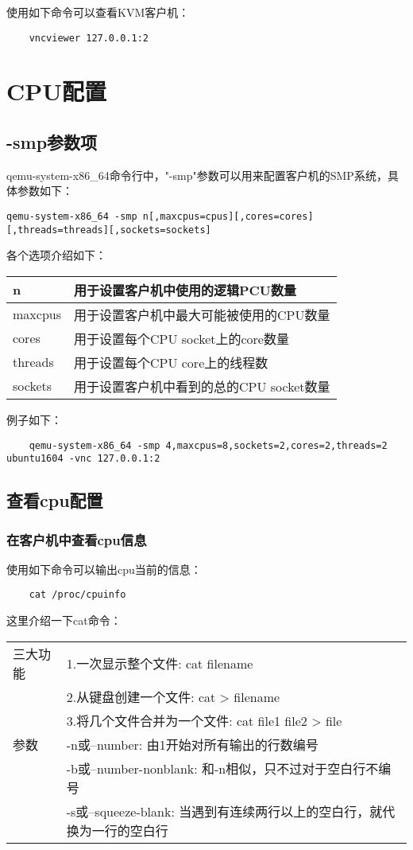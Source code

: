 \documentclass[a4paper,left=2.5cm,right=2.5cm,11pt]{article}
\newcommand{\interval}{\vspace{0.5em}}
\begin{document}
	使用如下命令可以查看KVM客户机：
	\begin{lstlisting}
	vncviewer 127.0.0.1:2
	\end{lstlisting}

\clearpage

\section{CPU配置}
\subsection{-smp参数项}
	qemu-system-x86\_64命令行中，"-smp"参数可以用来配置客户机的SMP系统，具体参数如下：
	\begin{lstlisting}[numberstyle = \color{white}]
	qemu-system-x86_64 -smp n[,maxcpus=cpus][,cores=cores][,threads=threads][,sockets=sockets]
	\end{lstlisting}

	各个选项介绍如下：
	\interval
	\begin{longtable}{p{1.5cm}p{10cm}}
	\hline
	n & 用于设置客户机中使用的逻辑PCU数量 \\
	\hline
	maxcpus & 用于设置客户机中最大可能被使用的CPU数量 \\
	\hline
	cores & 用于设置每个CPU socket上的core数量 \\
	\hline
	threads & 用于设置每个CPU core上的线程数 \\
	\hline
	sockets & 用于设置客户机中看到的总的CPU socket数量 \\
	\hline
	\end{longtable}
	\interval

	例子如下：
	\begin{lstlisting}
	qemu-system-x86_64 -smp 4,maxcpus=8,sockets=2,cores=2,threads=2 ubuntu1604 -vnc 127.0.0.1:2
	\end{lstlisting}

\subsection{查看cpu配置}
\subsubsection{在客户机中查看cpu信息}
	使用如下命令可以输出cpu当前的信息：
	\begin{lstlisting}
	cat /proc/cpuinfo
	\end{lstlisting}

	这里介绍一下cat命令：
	\interval
	\begin{longtable}{lp{12cm}}
	\hline
	三大功能 & 1.一次显示整个文件: cat filename \\
		   & 2.从键盘创建一个文件: cat > filename \\
		   & 3.将几个文件合并为一个文件: cat file1 file2 > file \\
	\hline
	参数  & -n或--number: 由1开始对所有输出的行数编号 \\
		 & -b或--number-nonblank: 和-n相似，只不过对于空白行不编号 \\
		 & -s或--squeeze-blank: 当遇到有连续两行以上的空白行，就代换为一行的空白行 \\
	\hline
	\end{longtable}
	\interval
\end{document}
